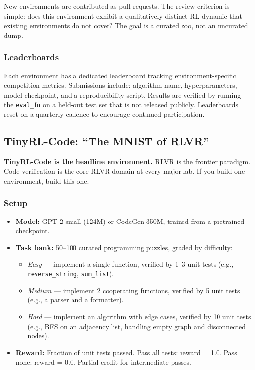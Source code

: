 New environments are contributed as pull requests. The review criterion is simple: does this environment exhibit a qualitatively distinct RL dynamic that existing environments do not cover? The goal is a curated zoo, not an uncurated dump.

\subsubsection{Leaderboards}

Each environment has a dedicated leaderboard tracking environment-specific competition metrics. Submissions include: algorithm name, hyperparameters, model checkpoint, and a reproducibility script. Results are verified by running the \texttt{eval\_fn} on a held-out test set that is not released publicly. Leaderboards reset on a quarterly cadence to encourage continued participation.

\subsection{TinyRL-Code: ``The MNIST of RLVR''}

\textbf{TinyRL-Code is the headline environment.} RLVR is the frontier paradigm. Code verification is the core RLVR domain at every major lab. If you build one environment, build this one.

\subsubsection*{Setup}

\begin{itemize}
  \item \textbf{Model:} GPT-2 small (124M) or CodeGen-350M, trained from a pretrained checkpoint.
  \item \textbf{Task bank:} 50--100 curated programming puzzles, graded by difficulty:
    \begin{itemize}
      \item \textit{Easy} --- implement a single function, verified by 1--3 unit tests (e.g., \texttt{reverse\_string}, \texttt{sum\_list}).
      \item \textit{Medium} --- implement 2 cooperating functions, verified by 5 unit tests (e.g., a parser and a formatter).
      \item \textit{Hard} --- implement an algorithm with edge cases, verified by 10 unit tests (e.g., BFS on an adjacency list, handling empty graph and disconnected nodes).
    \end{itemize}
  \item \textbf{Reward:} Fraction of unit tests passed. Pass all tests: reward = 1.0. Pass none: reward = 0.0. Partial credit for intermediate passes.
\end{itemize}


